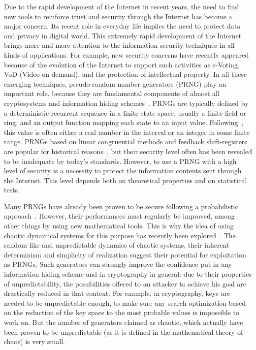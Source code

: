 \documentclass[journal]{IEEEtran}
\begin{document}
Due to the rapid development of the Internet in recent years, the need to find new tools to reinforce trust and security through the Internet has become a major concern. 
Its recent role in everyday life implies the need to protect data and privacy in digital world. This extremely rapid development of the Internet brings more and more attention to the information security techniques in all kinds of applications. For example, new security concerns have recently appeared because of the evolution of the Internet to support such activities as e-Voting, VoD (Video on demand), and the protection of intellectual property. 
In all these emerging techniques, pseudo-random number generators (PRNG) play an important role, because they are fundamental components of almost all cryptosystems and information hiding schemes~\cite{Tong2009480,Erclebi2005}.
PRNGs are typically defined by a deterministic recurrent sequence in a finite state space, usually a finite field or ring, and an output function mapping each state to an input value. Following~\cite{L'ecuyer2008}, this value is often either a real number in the interval  or an integer in some finite range. PRNGs based on linear congruential methods and feedback shift-registers are popular for historical reasons~\cite{Knuth1998}, but their security level often has been revealed to be inadequate by today's standards.
However, to use a PRNG with a high level of security is a necessity to protect the information contents sent through the Internet.
This level depends both on theoretical properties and on statistical tests.

Many PRNGs have already been proven to be secure following a probabilistic approach~\cite{Marchi20093328,Sachez2005,Tan2002693}. However, their performances must regularly be improved, among other things by using new mathematical tools.
This is why the idea of using chaotic dynamical systems for this purpose has recently been explored~\cite{Falcioni2005,Cecen2009}.
The random-like and unpredictable dynamics of chaotic systems, their inherent determinism and simplicity of realization suggest their potential for exploitation as PRNGs.
Such generators can strongly improve the confidence put in any information hiding scheme and in cryptography in general: due to their properties of unpredictability, the possibilities offered to an attacker to achieve his goal are drastically reduced in that context.
For example, in cryptography, keys are needed to be unpredictable enough, to make sure any search optimization based on the reduction of the key space to the most probable values is impossible to work on.
But the number of generators claimed as chaotic, which actually have been proven to be unpredictable (as it is defined in the mathematical theory of chaos) is very small.
\end{document}
